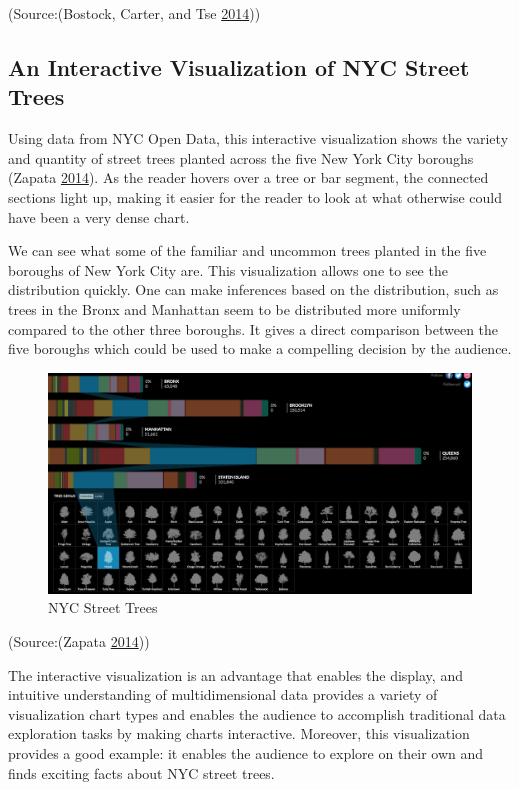 \documentclass[]{book}
\begin{document}
(Source:(Bostock, Carter, and Tse
\protect\hyperlink{ref-rent_or_buy}{2014}))

\subsection{An Interactive Visualization of NYC Street
Trees}\label{an-interactive-visualization-of-nyc-street-trees}

Using data from NYC Open Data, this interactive visualization shows the
variety and quantity of street trees planted across the five New York
City boroughs (Zapata \protect\hyperlink{ref-trees}{2014}). As the
reader hovers over a tree or bar segment, the connected sections light
up, making it easier for the reader to look at what otherwise could have
been a very dense chart.

We can see what some of the familiar and uncommon trees planted in the
five boroughs of New York City are. This visualization allows one to see
the distribution quickly. One can make inferences based on the
distribution, such as trees in the Bronx and Manhattan seem to be
distributed more uniformly compared to the other three boroughs. It
gives a direct comparison between the five boroughs which could be used
to make a compelling decision by the audience.

\begin{figure}
\centering
\includegraphics{images/NY_trees.png}
\caption{NYC Street Trees}
\end{figure}

(Source:(Zapata \protect\hyperlink{ref-trees}{2014}))

The interactive visualization is an advantage that enables the display,
and intuitive understanding of multidimensional data provides a variety
of visualization chart types and enables the audience to accomplish
traditional data exploration tasks by making charts interactive.
Moreover, this visualization provides a good example: it enables the
audience to explore on their own and finds exciting facts about NYC
street trees.
\end{document}
